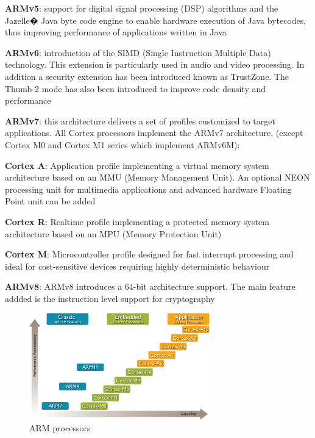 \documentclass[pdftex,10pt,a4paper]{report}
\newenvironment{packed_item}{
\begin{itemize}
  \setlength{\itemsep}{1pt}
  \setlength{\parskip}{0pt}
  \setlength{\parsep}{0pt}
}{\end{itemize}}
\begin{document}
\begin{packed_item}
	\item \textbf{ARMv5}: support for digital signal processing (DSP) algorithms and the Jazelle� Java byte code engine to enable hardware execution of Java bytecodes, thus improving performance of applications written in Java
	\item \textbf{ARMv6}: introduction of the SIMD (Single Instruction Multiple Data) technology. This extension is particularly used in audio and video processing. In addition a security extension has been introduced known as TrustZone. The Thumb-2 mode has also been introduced to improve code density and performance
	\item \textbf{ARMv7}: this architecture delivers a set of profiles customized to target applications. All Cortex processors implement the ARMv7 architecture, (except Cortex M0 and Cortex M1 series which implement ARMv6M):
	\begin{packed_item}
		\item \textbf{Cortex A}: Application profile implementing a virtual memory system architecture based on an MMU (Memory Management Unit). An optional NEON processing unit for multimedia applications and advanced hardware Floating Point unit can be added
		\item \textbf{Cortex R}: Realtime profile implementing a protected memory system architecture based on an MPU (Memory Protection Unit)
		\item \textbf{Cortex M}: Microcontroller profile designed for fast interrupt processing and ideal for cost-sensitive devices requiring highly deterministic behaviour
	\end{packed_item}
	\item \textbf{ARMv8}: ARMv8 introduces a 64-bit architecture support. The main feature addded is the instruction level support for cryptography
\end{packed_item}


\begin{figure}[h!]
\centering
\includegraphics[width=0.7\textwidth]{./arm_proc.jpg}
\caption{ARM processors}
\label{ARM processors}
\end{figure}
\end{document}
